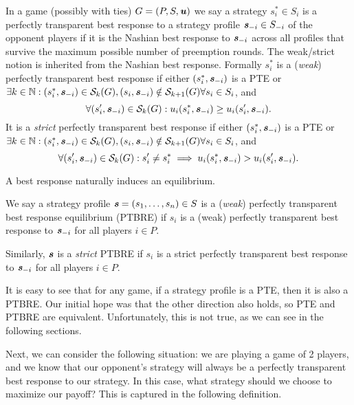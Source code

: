 \begin{definition}
	In a game (possibly with ties) $G = (P, S, \boldsymbol{\mathit{u}})$ we say a strategy $s_i^* \in S_i$ is a perfectly transparent best response to a strategy profile $\boldsymbol{\mathit{s}}_{-i} \in S_{-i}$ of the opponent players if it is the Nashian best response to $\boldsymbol{\mathit{s}}_{-i}$ across all profiles that survive the maximum possible number of preemption rounds.
	The weak/strict notion is inherited from the Nashian best response.
	Formally $s_i^*$ is a (\textit{weak}) perfectly transparent best response if either $(s_i^*, \boldsymbol{\mathit{s}}_{-i})$ is a PTE or $\exists k \in \mathbb{N}: (s_i^*, \boldsymbol{\mathit{s}}_{-i}) \in \mathcal{S}_k(G), (s_i, \boldsymbol{\mathit{s}}_{-i}) \notin \mathcal{S}_{k+1}(G) \forall s_i \in S_i$, and
	\[
		\forall (s_i', \boldsymbol{\mathit{s}}_{-i}) \in \mathcal{S}_k(G): u_i(s_i^*, \boldsymbol{\mathit{s}}_{-i}) \ge u_i(s_i', \boldsymbol{\mathit{s}}_{-i}).
	\]
	It is a \textit{strict} perfectly transparent best response if either $(s_i^*, \boldsymbol{\mathit{s}}_{-i})$ is a PTE or $\exists k \in \mathbb{N}: (s_i^*, \boldsymbol{\mathit{s}}_{-i}) \in \mathcal{S}_k(G), (s_i, \boldsymbol{\mathit{s}}_{-i}) \notin \mathcal{S}_{k+1}(G) \forall s_i \in S_i$, and
	\[
		\forall (s_i', \boldsymbol{\mathit{s}}_{-i}) \in \mathcal{S}_k(G): s_i' \ne s_i^* \implies u_i(s_i^*, \boldsymbol{\mathit{s}}_{-i}) > u_i(s_i', \boldsymbol{\mathit{s}}_{-i}).
	\]
\end{definition}

A best response naturally induces an equilibrium.

\begin{definition}
	We say a strategy profile $\boldsymbol{\mathit{s}} = (s_1, \dots, s_n) \in S$ is a (\textit{weak}) perfectly transparent best response equilibrium (PTBRE) if $s_i$ is a (weak) perfectly transparent best response to $\boldsymbol{\mathit{s}}_{-i}$ for all players $i \in P$.
	
	Similarly, $\boldsymbol{\mathit{s}}$ is a \textit{strict} PTBRE if $s_i$ is a strict perfectly transparent best response to $\boldsymbol{\mathit{s}}_{-i}$ for all players $i \in P$.
\end{definition}

It is easy to see that for any game, if a strategy profile is a PTE, then it is also a PTBRE.
Our initial hope was that the other direction also holds, so PTE and PTBRE are equivalent.
Unfortunately, this is not true, as we can see in the following sections.

Next, we can consider the following situation: we are playing a game of 2 players, and we know that our opponent's strategy will always be a perfectly transparent best response to our strategy.
In this case, what strategy should we choose to maximize our payoff?
This is captured in the following definition.

